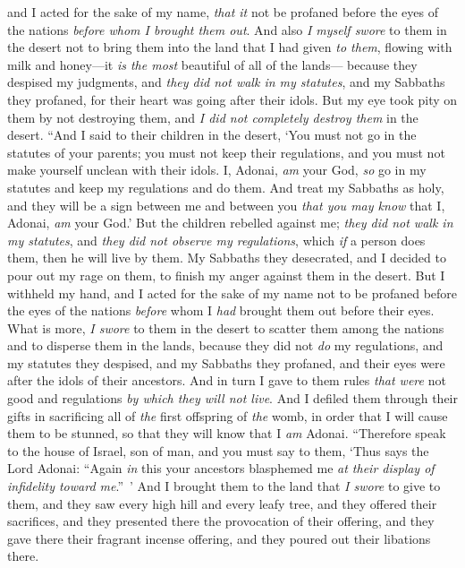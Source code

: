 \begin{biblechapter}
\verse and I acted for the sake of my name, \textit{that it} not be profaned before the eyes of the nations \textit{before whom I brought them out}.
\verse And also \textit{I myself swore} to them in the desert not to bring them into the land that I had given \textit{to them}, flowing with milk and honey—it \textit{is the most} beautiful of all of the lands—
\verse because they despised my judgments, and \textit{they did not walk in my statutes}, and my Sabbaths they profaned, for their heart was going after their idols.
\verse But my eye took pity on them by not destroying them, and \textit{I did not completely destroy them} in the desert.
\verse “And I said to their children in the desert, ‘You must not go in the statutes of your parents; you must not keep their regulations, and you must not make yourself unclean with their idols.
\verse I, Adonai, \textit{am} your God, \textit{so} go in my statutes and keep my regulations and do them.
\verse And treat my Sabbaths as holy, and they will be a sign between me and between you \textit{that you may know} that I, Adonai, \textit{am} your God.’
\verse But the children rebelled against me; \textit{they did not walk in my statutes}, and \textit{they did not observe my regulations}, which \textit{if} a person does them, then he will live by them. My Sabbaths they desecrated, and I decided to pour out my rage on them, to finish my anger against them in the desert.
\verse But I withheld my hand, and I acted for the sake of my name not to be profaned before the eyes of the nations \textit{before} whom I \textit{had} brought them out before their eyes.
\verse What is more, \textit{I swore} to them in the desert to scatter them among the nations and to disperse them in the lands,
\verse because they did not \textit{do} my regulations, and my statutes they despised, and my Sabbaths they profaned, and their eyes were after the idols of their ancestors.
\verse And in turn I gave to them rules \textit{that were} not good and regulations \textit{by which they will not live}.
\verse And I defiled them through their gifts in sacrificing all of \textit{the} first offspring of \textit{the} womb, in order that I will cause them to be stunned, so that they will know that I \textit{am} Adonai.
\verse “Therefore speak to the house of Israel, son of man, and you must say to them, ‘Thus says the Lord Adonai: “Again \textit{in} this your ancestors blasphemed me \textit{at their display of infidelity toward me}.” ’
\verse And I brought them to the land that \textit{I swore} to give to them, and they saw every high hill and every leafy tree, and they offered their sacrifices, and they presented there the provocation of their offering, and they gave there their fragrant incense offering, and they poured out their libations there.

\end{biblechapter}

